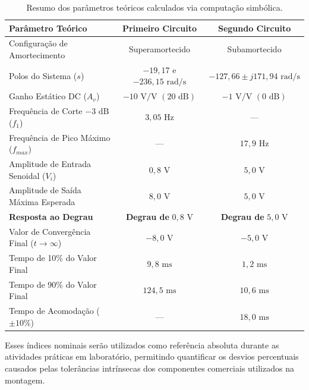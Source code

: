 \begin{table}[htbp]
	\centering
	\caption{Resumo dos parâmetros teóricos calculados via computação simbólica.}
	\label{tab:resumo_teorico}
	\begin{tabular}{lcc}
		\hline
		\textbf{Parâmetro Teórico} & \textbf{Primeiro Circuito} & \textbf{Segundo Circuito} \\ \hline
		Configuração de Amortecimento & Superamortecido & Subamortecido \\ 
		Polos do Sistema ($s$) & $-19,17$ e $-236,15 \text{ rad/s}$ & $-127,66 \pm j171,94 \text{ rad/s}$ \\ 
		Ganho Estático DC ($A_v$) & $-10 \text{ V/V } (20 \text{ dB})$ & $-1 \text{ V/V } (0 \text{ dB})$ \\ 
		Frequência de Corte $-3\text{ dB}$ ($f_1$) & $3,05 \text{ Hz}$ & — \\ 
		Frequência de Pico Máximo ($f_{max}$) & — & $17,9 \text{ Hz}$ \\ 
		Amplitude de Entrada Senoidal ($V_i$) & $0,8 \text{ V}$ & $5,0 \text{ V}$ \\ 
		Amplitude de Saída Máxima Esperada & $8,0 \text{ V}$ & $5,0 \text{ V}$ \\ \hline
		\textbf{Resposta ao Degrau} & \textbf{Degrau de } $0,8\text{ V}$ & \textbf{Degrau de } $5,0\text{ V}$ \\ \hline
		Valor de Convergência Final ($t \to \infty$) & $-8,0 \text{ V}$ & $-5,0 \text{ V}$ \\ 
		Tempo de 10\% do Valor Final & $9,8 \text{ ms}$ & $1,2 \text{ ms}$ \\ 
		Tempo de 90\% do Valor Final & $124,5 \text{ ms}$ & $10,6 \text{ ms}$ \\ 
		Tempo de Acomodação ($\pm 10\%$) & — & $18,0 \text{ ms}$ \\ \hline
	\end{tabular}
\end{table}

Esses índices nominais serão utilizados como referência absoluta durante as atividades práticas em laboratório, permitindo quantificar os desvios percentuais causados pelas tolerâncias intrínsecas dos componentes comerciais utilizados na montagem.